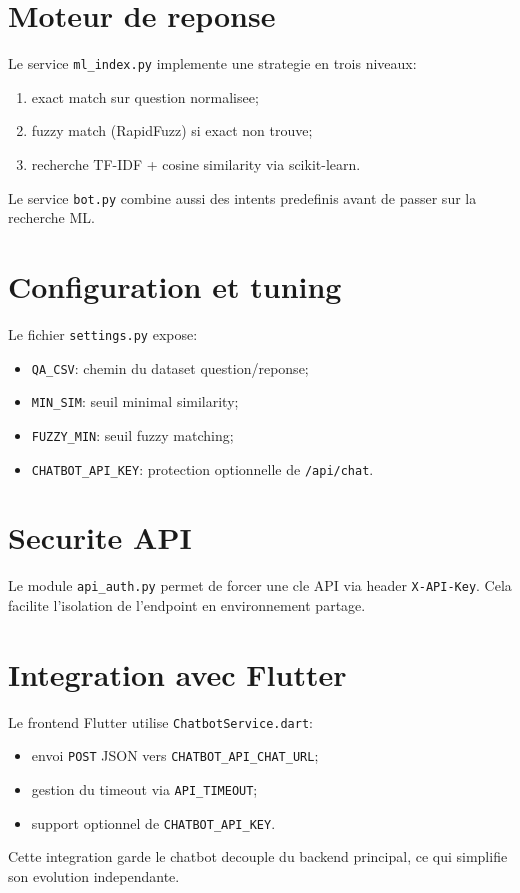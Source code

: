 \section{Moteur de reponse}

Le service \texttt{ml\_index.py} implemente une strategie en trois niveaux:
\begin{enumerate}[leftmargin=*]
  \item exact match sur question normalisee;
  \item fuzzy match (RapidFuzz) si exact non trouve;
  \item recherche TF-IDF + cosine similarity via scikit-learn.
\end{enumerate}

Le service \texttt{bot.py} combine aussi des intents predefinis avant de passer sur la recherche ML.

\section{Configuration et tuning}

Le fichier \texttt{settings.py} expose:
\begin{itemize}[leftmargin=*]
  \item \texttt{QA\_CSV}: chemin du dataset question/reponse;
  \item \texttt{MIN\_SIM}: seuil minimal similarity;
  \item \texttt{FUZZY\_MIN}: seuil fuzzy matching;
  \item \texttt{CHATBOT\_API\_KEY}: protection optionnelle de \texttt{/api/chat}.
\end{itemize}

\section{Securite API}

Le module \texttt{api\_auth.py} permet de forcer une cle API via header \texttt{X-API-Key}. Cela facilite l'isolation de l'endpoint en environnement partage.

\section{Integration avec Flutter}

Le frontend Flutter utilise \texttt{ChatbotService.dart}:
\begin{itemize}[leftmargin=*]
  \item envoi \texttt{POST} JSON vers \texttt{CHATBOT\_API\_CHAT\_URL};
  \item gestion du timeout via \texttt{API\_TIMEOUT};
  \item support optionnel de \texttt{CHATBOT\_API\_KEY}.
\end{itemize}

Cette integration garde le chatbot decouple du backend principal, ce qui simplifie son evolution independante.
